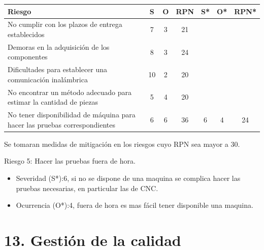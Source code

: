\documentclass[11pt]{charter}
\begin{document}
\begin{table}[htpb]
\centering
\begin{tabularx}{\linewidth}{@{}|X|c|c|c|c|c|c|@{}}
\hline
\rowcolor[HTML]{C0C0C0} 
Riesgo & S & O & RPN & S* & O* & RPN* \\ \hline
   No cumplir con los plazos de entrega establecidos   & 7  &  3 &  21   &    &    &      \\ \hline
   Demoras en la adquisición de los componentes  & 8  & 3  &    24 &    &    &      \\ \hline
   Dificultades para establecer una comunicación inalámbrica   & 10  & 2  & 20    &    &    &      \\ \hline
   No encontrar un método adecuado para estimar la cantidad de piezas  & 5  & 4  &   20  &    &    &      \\ \hline
     No tener disponibilidad de máquina para hacer las pruebas correspondientes  & 6  &  6 &    36 &  6  &  4  &   24   \\ \hline
\end{tabularx}%
\end{table}

Se tomaran medidas de mitigación en los riesgos cuyo RPN sea mayor a 30.

Riesgo 5: Hacer las pruebas fuera de hora.
\begin{itemize}
    \item Severidad (S*):6, si no se dispone de una maquina se complica hacer las pruebas necesarias, en particular las de CNC.
    \item Ocurrencia (O*):4, fuera de hora es mas fácil tener disponible una maquina.
\end{itemize}

\section{13. Gestión de la calidad}
\label{sec:calidad}
\end{document}

